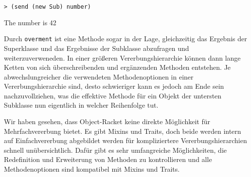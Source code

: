 \begin{lstlisting}
> (send (new Sub) number)
\end{lstlisting}
{\routput The number is 42}

Durch \texttt{overment} ist eine Methode sogar in der Lage, gleichzeitig das Ergebnis der Superklasse und das Ergebnisse der Subklasse abzufragen und weiterzuverweneden. In einer größeren Vererbungshierarchie können dann lange Ketten von sich überschreibenden und ergänzenden Methoden entstehen. Je abwechslungreicher die verwendeten Methodenoptionen in einer Vererbungshierarchie sind, desto schwieriger kann es jedoch am Ende sein nachzuvollziehen, was die effektive Methode für ein Objekt der untersten Subklasse nun eigentlich in welcher Reihenfolge tut.

Wir haben gesehen, dass Object-Racket keine direkte Möglichkeit für Mehrfachvererbung bietet. Es gibt Mixins und Traits, doch beide werden intern auf Einfachvererbung abgebildet werden für kompliziertere Vererbungshierarchien schnell unübersichtlich. Dafür gibt es sehr umfangreiche Möglichkeiten, die Redefinition und Erweiterung von Methoden zu kontrollieren und alle  Methodenoptionen sind kompatibel mit Mixins und Traits. 

